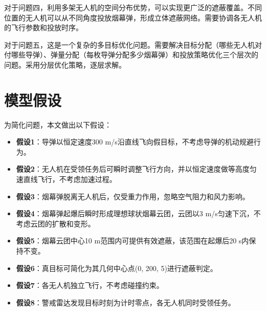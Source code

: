 \documentclass[12pt,a4paper]{article}
\begin{document}
\indent 对于问题四，利用多架无人机的空间分布优势，可以实现更广泛的遮蔽覆盖。不同位置的无人机可以从不同角度投放烟幕弹，形成立体遮蔽网络。需要协调各无人机的飞行参数和投放时序。

\indent 对于问题五，这是一个复杂的多目标优化问题。需要解决目标分配（哪些无人机对付哪些导弹）、弹量分配（每枚导弹分配多少烟幕弹）和投放策略优化三个层次的问题。采用分层优化策略，逐层求解。

\newpage

\section{模型假设}

\indent 为简化问题，本文做出以下假设：

\begin{itemize}
\item \textbf{假设1}：导弹以恒定速度300 m/s沿直线飞向假目标，不考虑导弹的机动规避行为。

\item \textbf{假设2}：无人机在受领任务后可瞬时调整飞行方向，并以恒定速度做等高度匀速直线飞行，不考虑加速过程。

\item \textbf{假设3}：烟幕弹脱离无人机后，仅受重力作用，忽略空气阻力和风力影响。

\item \textbf{假设4}：烟幕弹起爆后瞬时形成理想球状烟幕云团，云团以3 m/s匀速下沉，不考虑云团的扩散和变形。

\item \textbf{假设5}：烟幕云团中心10 m范围内可提供有效遮蔽，该范围在起爆后20 s内保持不变。

\item \textbf{假设6}：真目标可简化为其几何中心点(0, 200, 5)进行遮蔽判定。

\item \textbf{假设7}：各无人机独立飞行，不考虑碰撞约束。

\item \textbf{假设8}：警戒雷达发现目标时刻为计时零点，各无人机同时受领任务。
\end{itemize}
\end{document}
